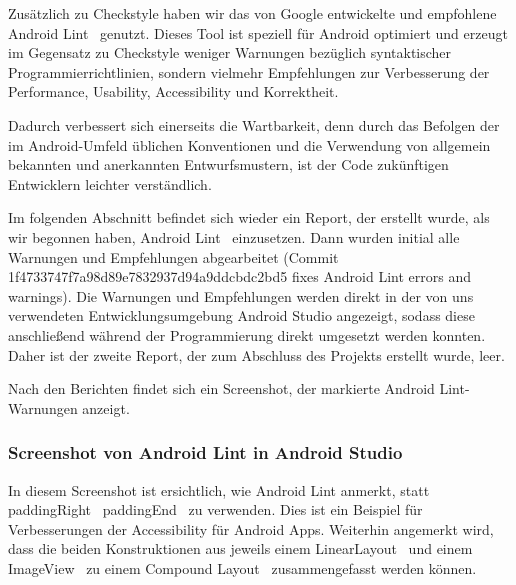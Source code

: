 Zusätzlich zu Checkstyle haben wir das von Google entwickelte und empfohlene \glqq Android Lint\grqq~ genutzt. Dieses Tool ist speziell für Android optimiert und erzeugt im Gegensatz zu Checkstyle weniger Warnungen bezüglich syntaktischer Programmierrichtlinien, sondern vielmehr Empfehlungen zur Verbesserung der Performance, Usability, Accessibility und Korrektheit.

Dadurch verbessert sich einerseits die Wartbarkeit, denn durch das Befolgen der im Android-Umfeld üblichen Konventionen und die Verwendung von allgemein bekannten und anerkannten Entwurfsmustern, ist der Code zukünftigen Entwicklern leichter verständlich.

Im folgenden Abschnitt befindet sich wieder ein Report, der erstellt wurde, als wir begonnen haben, \glqq Android Lint\grqq~ einzusetzen. Dann wurden initial alle Warnungen und Empfehlungen abgearbeitet (Commit 1f4733747f7a98d89e7832937d94a9ddcbdc2bd5 \glqq fixes Android Lint errors and warnings\grqq). Die Warnungen und Empfehlungen werden direkt in der von uns verwendeten Entwicklungsumgebung Android Studio angezeigt, sodass diese anschließend während der Programmierung direkt umgesetzt werden konnten. Daher ist der zweite Report, der zum Abschluss des Projekts erstellt wurde, leer.

Nach den Berichten findet sich ein Screenshot, der markierte Android Lint-Warnungen anzeigt.







\subsubsection{Screenshot von Android Lint in Android Studio}

In diesem Screenshot ist ersichtlich, wie Android Lint anmerkt, statt \glqq paddingRight\grqq~ \glqq paddingEnd\grqq~ zu verwenden. Dies ist ein Beispiel für Verbesserungen der Accessibility für Android Apps. Weiterhin angemerkt wird, dass die beiden Konstruktionen aus jeweils einem \glqq LinearLayout\grqq~ und einem \glqq ImageView\grqq~ zu einem \glqq Compound Layout\grqq~ zusammengefasst werden können.

